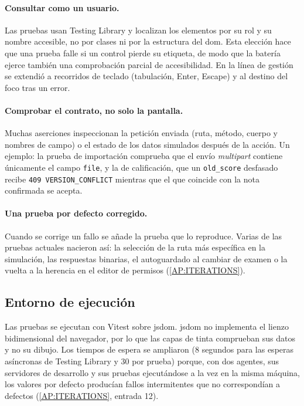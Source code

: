\paragraph{Consultar como un usuario.} Las pruebas usan Testing Library
\cite{testing_library} y localizan los elementos por su rol y su nombre accesible, no por
clases ni por la estructura del \acs{dom}. Esta elección hace que una prueba falle si un
control pierde su etiqueta, de modo que la batería ejerce también una comprobación parcial
de accesibilidad. En la línea de gestión se extendió a recorridos de teclado (tabulación,
Enter, Escape) y al destino del foco tras un error.

\paragraph{Comprobar el contrato, no solo la pantalla.} Muchas aserciones inspeccionan la
petición enviada (ruta, método, cuerpo y nombres de campo) o el estado de los datos simulados
después de la acción. Un ejemplo: la prueba de importación comprueba que el envío
\textit{multipart} contiene únicamente el campo \texttt{file}, y la de calificación, que un
\texttt{old\_score} desfasado recibe \texttt{409 VERSION\_CONFLICT} mientras que el que
coincide con la nota confirmada se acepta.

\paragraph{Una prueba por defecto corregido.} Cuando se corrige un fallo se añade la prueba
que lo reproduce. Varias de las pruebas actuales nacieron así: la selección de la ruta más
específica en la simulación, las respuestas binarias, el autoguardado al cambiar de examen o
la vuelta a la herencia en el editor de permisos (\cref{AP:ITERATIONS}).

\subsection{Entorno de ejecución}

Las pruebas se ejecutan con Vitest \cite{vitest_docs} sobre jsdom. jsdom no implementa el
lienzo bidimensional del navegador, por lo que las capas de tinta comprueban sus datos y no
su dibujo. Los tiempos de espera se ampliaron (8 segundos para las esperas asíncronas de
Testing Library y 30 por prueba) porque, con dos agentes, sus servidores de desarrollo y sus
pruebas ejecutándose a la vez en la misma máquina, los valores por defecto producían fallos
intermitentes que no correspondían a defectos (\cref{AP:ITERATIONS}, entrada 12).
